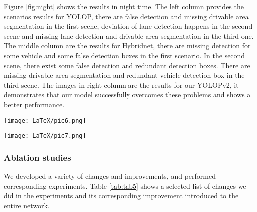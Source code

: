 \documentclass[10pt,twocolumn,letterpaper]{article}
\begin{document}
Figure \ref{fig:night} shows the results in night time. The left column provides the scenarios results for YOLOP, there are false detection and missing drivable area segmentation in the first scene, deviation of lane detection happens in the second scene and missing lane detection and drivable area segmentation in the third one. The middle column are the results for Hybridnet, there are missing detection for some vehicle and some false detection boxes in the first scenario. In the second scene, there exist some false detection and redundant detection boxes. There are missing drivable area segmentation and redundant vehicle detection box in the third scene. The images in right column are the results for our YOLOPv2, it demonstrates that our model successfully overcomes these problems and shows a better performance.

\begin{figure*}
        \begin{center}
            \texttt{[image: LaTeX/pic6.png]}
        \end{center}
\caption{The day-time results.}
        \label{fig:daytime}        
\end{figure*}

\begin{figure*}
        \begin{center}
            \texttt{[image: LaTeX/pic7.png]}
        \end{center}
\caption{The night-time results.}
        \label{fig:night}        
\end{figure*}


\subsubsection{Ablation studies}
We developed a variety of changes and improvements, and performed corresponding experiments. Table \ref{tab:tab5} shows a selected list of changes we did in the experiments and its corresponding improvement introduced to the entire network.
\end{document}
